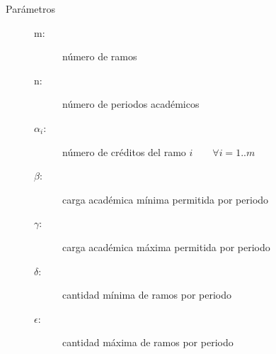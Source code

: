 \documentclass[letterpaper,10pt]{article}
\begin{document}
\begin{description}
  \item[Parámetros] \hfill
    \begin{description}
      \item[m:] número de ramos
      \item[n:] número de periodos académicos
      \item[$\alpha_i$:] número de créditos del ramo $i \qquad \forall i=1..m$
      \item[$\beta$:] carga académica mínima permitida por periodo
      \item[$\gamma$:] carga académica máxima permitida por periodo
      \item[$\delta$:] cantidad mínima de ramos por periodo
      \item[$\epsilon$:] cantidad máxima de ramos por periodo
    \end{description}


\end{description}
\end{document}
